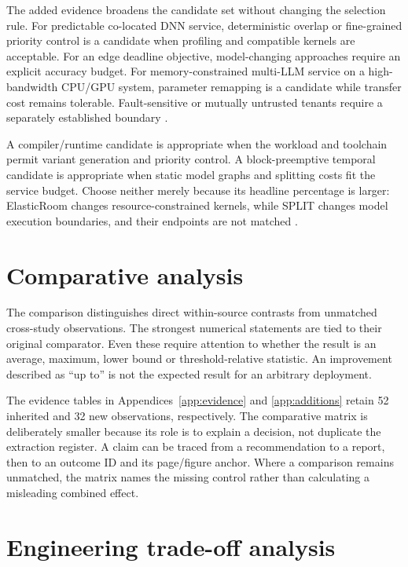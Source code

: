 The added evidence broadens the candidate set without changing the selection rule. For predictable co-located DNN service, deterministic overlap or fine-grained priority control is a candidate when profiling and compatible kernels are acceptable. For an edge deadline objective, model-changing approaches require an explicit accuracy budget. For memory-constrained multi-LLM service on a high-bandwidth CPU/GPU system, parameter remapping is a candidate while transfer cost remains tolerable. Fault-sensitive or mutually untrusted tenants require a separately established boundary \cite{s021,s022,s023,s024,s025,s026}.

A compiler/runtime candidate is appropriate when the workload and toolchain permit variant generation and priority control. A block-preemptive temporal candidate is appropriate when static model graphs and splitting costs fit the service budget. Choose neither merely because its headline percentage is larger: ElasticRoom changes resource-constrained kernels, while SPLIT changes model execution boundaries, and their endpoints are not matched \cite{s028,s029}.

\section{Comparative analysis}
The comparison distinguishes direct within-source contrasts from unmatched cross-study observations. The strongest numerical statements are tied to their original comparator. Even these require attention to whether the result is an average, maximum, lower bound or threshold-relative statistic. An improvement described as ``up to'' is not the expected result for an arbitrary deployment.



The evidence tables in Appendices~\ref{app:evidence} and \ref{app:additions} retain 52 inherited and 32 new observations, respectively. The comparative matrix is deliberately smaller because its role is to explain a decision, not duplicate the extraction register. A claim can be traced from a recommendation to a report, then to an outcome ID and its page/figure anchor. Where a comparison remains unmatched, the matrix names the missing control rather than calculating a misleading combined effect.

\section{Engineering trade-off analysis}
